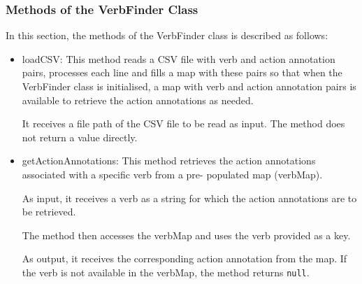 \subsubsection*{Methods of the VerbFinder Class}
In this section, the methods of the VerbFinder class is described as follows:
\begin{itemize}	
	\item loadCSV: This method reads a CSV file with verb and action annotation pairs, processes each line and fills a map with these pairs so that when the VerbFinder class is initialised, a map with verb and action annotation pairs is available to retrieve the action annotations as needed.
	
	It receives a file path of the CSV file to be read as input. The method does not return a value directly.
	
	\item getActionAnnotations: This method retrieves the action annotations associated with a specific verb from a pre- populated map (verbMap).
	
	As input, it receives a verb as a string for which the action annotations are to be retrieved.
	
	The method then accesses the verbMap and uses the verb provided as a key.
	
	As output, it receives the corresponding action annotation from the map. If the verb is not available in the verbMap, the method returns \texttt{null}.
	
\end{itemize}
